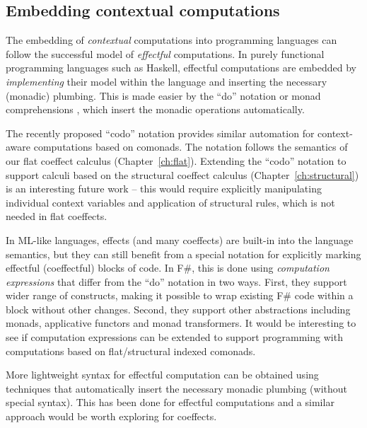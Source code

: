 
\subsection{Embedding contextual computations}
\label{sec:further-impl-embed}

The embedding of \emph{contextual} computations into programming languages can follow the successful
model of \emph{effectful} computations. In purely functional programming languages such as Haskell,
effectful computations are embedded by \emph{implementing} their model within the language
and inserting the necessary (monadic) plumbing. This is made easier by the ``do'' notation or
monad comprehensions \cite{other-haskell98,monads-compre}, which insert the monadic operations
automatically.

The recently proposed ``codo'' notation \cite{comonads-codo} provides similar automation for
context-aware computations based on comonads. The notation follows the semantics of our
flat coeffect calculus (Chapter~\ref{ch:flat}). Extending the ``codo'' notation to support calculi based
on the structural coeffect calculus (Chapter~\ref{ch:structural}) is an interesting future work --
this would require explicitly manipulating individual context variables and application of structural
rules, which is not needed in flat coeffects.

In ML-like languages, effects (and many coeffects) are built-in into the language semantics,
but they can still benefit from a special notation for explicitly marking effectful (coeffectful)
blocks of code. In F\#, this is done using \emph{computation expressions}  \cite{app-computation-zoo}
that differ from the ``do'' notation in two ways. First, they support wider range of
constructs, making it possible to wrap existing F\# code within a block without other changes.
Second, they support other abstractions including monads, applicative functors and monad
transformers. It would be interesting to see if computation expressions can be extended to
support programming with computations based on flat/structural indexed comonads.

More lightweight syntax for effectful computation can be obtained using
techniques that automatically insert the necessary monadic plumbing (without
special syntax). This has been done for effectful computations \cite{monads-lightweight-ml}
and a similar approach would be worth exploring for coeffects.

